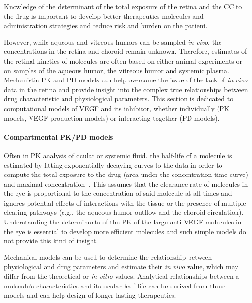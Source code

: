 \documentclass{article}
\begin{document}
Knowledge of the determinant of the total exposure of the retina and the CC to the drug is important to develop better therapeutics molecules and administration strategies and reduce risk and burden on the patient.

However, while aqueous and vitreous humors can be sampled \textit{in vivo}, the concentrations in the retina and choroid remain unknown. 
Therefore, estimates of the retinal kinetics of molecules are often based on either animal experiments or on samples of the aqueous humor, the vitreous humor and systemic plasma.
Mechanistic PK and PD models can help overcome the issue of the lack of \textit{in vivo} data in the retina and provide insight into the complex true relationships between drug characteristic and physiological parameters.
This section is dedicated to computational models of VEGF and its inhibitor, whether individually (PK models, VEGF production models) or interacting together (PD models).

\paragraph*{Compartmental PK/PD models}

Often in PK analysis of ocular or systemic fluid, the half-life of a molecule is estimated by fitting exponentially decaying curves to the data in order to compute the total exposure to the drug (area under the concentration-time curve) and maximal concentration~\cite{Bakri_2007, Kaiser_2019, Park_2015, Park_2016, Xu_2013}.
This assumes that the clearance rate of molecules in the eye is proportional to the concentration of said molecule at all times and ignores potential effects of interactions with the tissue or the presence of multiple clearing pathways (e.g., the aqueous humor outflow and the choroid circulation).
Understanding the determinants of the PK of the large anti-VEGF molecules in the eye is essential to develop more efficient molecules and such simple models do not provide this kind of insight.

Mechanical models can be used to determine the relationship between physiological and drug parameters and estimate their \textit{in vivo} value, which may differ from the theoretical or \textit{in vitro} values.
Analytical relationships between a molecule's characteristics and its ocular half-life can be derived from those models and can help design of longer lasting therapeutics.
\end{document}
